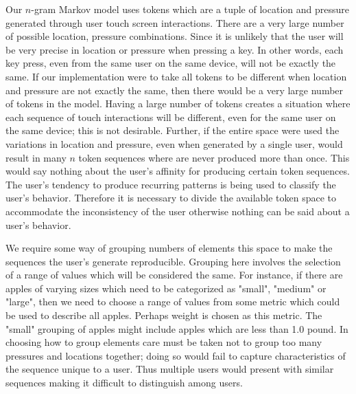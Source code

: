 Our $n$-gram Markov model uses tokens
which are a tuple of location and pressure
generated through user touch screen interactions. 
There are a very large number of possible
location, pressure combinations.
%
Since it is unlikely that the user will be
very precise in location or pressure
when pressing a key.
In other words,
each key press, 
even from the same user on the same device,
will not be exactly the same.
%
If our implementation were to take all tokens to be different when
location and pressure are not exactly the same,
then there would be a very large number of tokens in the model.
%
Having a large number of tokens
creates a situation where each sequence of 
touch interactions will be different,
even for the same user on the same device;
this is not desirable.
%
Further, if the entire space were used 
the variations in location and pressure,
even when generated by a single user,
would result in many $n$ token sequences
where are never produced more than once.
%
This would say nothing about
the user's affinity for producing certain token sequences.
The user's tendency to produce recurring patterns
is being used to classify the user's behavior.
%
Therefore it is necessary to divide the available token space
to accommodate the inconsistency of the user
otherwise
nothing can be said about a user's behavior.


We require some way of grouping numbers of elements this space
to make the sequences the user's generate reproducible.
%
Grouping here involves the selection of
a range of values which will be considered the same.
%
For instance, 
if there are apples of varying sizes
which need to be categorized as "small", "medium" or "large",
then we need to choose a range of values 
from some metric which could be used to describe all apples.
Perhaps weight is chosen as this metric.
The "small" grouping of apples might include
apples which are less than 1.0 pound.
%
In choosing how to group elements
care must be taken not to group too many 
pressures and locations together;
doing so would fail to capture characteristics
of the sequence unique to a user.
Thus multiple users would present with similar sequences
making it difficult to distinguish among users.

